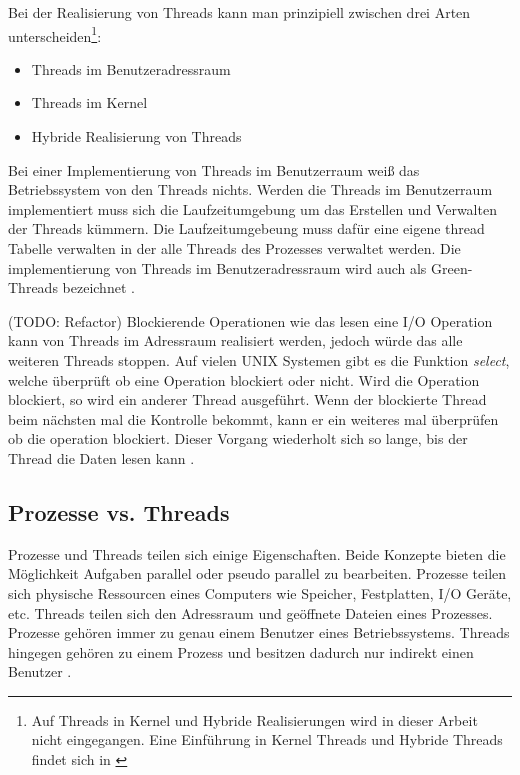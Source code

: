 Bei der Realisierung von Threads kann man prinzipiell zwischen drei Arten unterscheiden\footnote{Auf Threads in Kernel und Hybride Realisierungen wird in dieser Arbeit nicht eingegangen. Eine Einführung in Kernel Threads und Hybride Threads findet sich in \cite[p. 109-110]{tan09}}:

\begin{itemize}
  \item Threads im Benutzeradressraum
  \item Threads im Kernel 
  \item Hybride Realisierung von Threads
\end{itemize}

Bei einer Implementierung von Threads im Benutzerraum weiß das Betriebssystem von den Threads nichts. Werden die Threads im Benutzerraum implementiert muss sich die Laufzeitumgebung um das Erstellen und Verwalten der Threads kümmern. Die Laufzeitumgebeung muss dafür eine eigene thread Tabelle verwalten in der alle Threads des Prozesses verwaltet werden. Die implementierung von Threads im Benutzeradressraum wird auch als Green-Threads bezeichnet \cite[p. 106]{tan09}.

(TODO: Refactor)
Blockierende Operationen wie das lesen eine I/O Operation kann von Threads im Adressraum realisiert werden, jedoch würde das alle weiteren Threads stoppen. Auf vielen UNIX Systemen gibt es die Funktion \emph{select}, welche überprüft ob eine Operation blockiert oder nicht. Wird die Operation blockiert, so wird ein anderer Thread ausgeführt. Wenn der blockierte Thread beim nächsten mal die Kontrolle bekommt, kann er ein weiteres mal überprüfen ob die operation blockiert. Dieser Vorgang wiederholt sich so lange, bis der Thread die Daten lesen kann \cite[p. 108]{tan09}. 


\subsection{Prozesse vs. Threads}

Prozesse und Threads teilen sich einige Eigenschaften. Beide Konzepte bieten die Möglichkeit Aufgaben parallel oder pseudo parallel zu bearbeiten. Prozesse teilen sich physische Ressourcen eines Computers wie Speicher, Festplatten, I/O Geräte, etc. Threads teilen sich den Adressraum und geöffnete Dateien eines Prozesses. Prozesse gehören immer zu genau einem Benutzer eines Betriebssystems. Threads hingegen gehören zu einem Prozess und besitzen dadurch nur indirekt einen Benutzer \cite[p. 89]{tan09}. 



